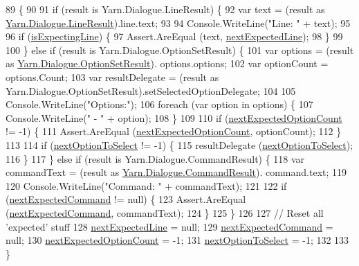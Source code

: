 \begin{DoxyCode}
89                                                                        \{
90 
91             \textcolor{keywordflow}{if} (result is Yarn.Dialogue.LineResult) \{
92                 var text = (result as \hyperlink{a00104}{Yarn.Dialogue.LineResult}).line.text;
93 
94                 Console.WriteLine(\textcolor{stringliteral}{"Line: "} + text);
95 
96                 \textcolor{keywordflow}{if} (\hyperlink{a00144_a47f35b8e8123ed9471883d02b8bc9f3e}{isExpectingLine}) \{
97                     Assert.AreEqual (text, \hyperlink{a00144_a3651ffb5425ab15bd1e42749347c1ee7}{nextExpectedLine});
98                 \}
99 
100             \} \textcolor{keywordflow}{else} \textcolor{keywordflow}{if} (result is Yarn.Dialogue.OptionSetResult) \{
101                 var options = (result as \hyperlink{a00117}{Yarn.Dialogue.OptionSetResult}).
      options.options;
102                 var optionCount = options.Count;
103                 var resultDelegate = (result as Yarn.Dialogue.OptionSetResult).setSelectedOptionDelegate;
104 
105                 Console.WriteLine(\textcolor{stringliteral}{"Options:"});
106                 \textcolor{keywordflow}{foreach} (var option \textcolor{keywordflow}{in} options) \{
107                     Console.WriteLine(\textcolor{stringliteral}{" - "} + option);
108                 \}
109 
110                 \textcolor{keywordflow}{if} (\hyperlink{a00144_aaabaf15249efe42f3d857129bdbc2864}{nextExpectedOptionCount} != -1) \{
111                     Assert.AreEqual (\hyperlink{a00144_aaabaf15249efe42f3d857129bdbc2864}{nextExpectedOptionCount}, optionCount);
112                 \}
113 
114                 \textcolor{keywordflow}{if} (\hyperlink{a00144_a343055fa693e9d5dfc1bdbfcd0f02676}{nextOptionToSelect} != -1) \{
115                     resultDelegate (\hyperlink{a00144_a343055fa693e9d5dfc1bdbfcd0f02676}{nextOptionToSelect});
116                 \}
117             \} \textcolor{keywordflow}{else} \textcolor{keywordflow}{if} (result is Yarn.Dialogue.CommandResult) \{
118                 var commandText = (result as \hyperlink{a00030}{Yarn.Dialogue.CommandResult}).
      command.text;
119 
120                 Console.WriteLine(\textcolor{stringliteral}{"Command: "} + commandText);
121 
122                 \textcolor{keywordflow}{if} (\hyperlink{a00144_a26fae5694fc06c3cdb12d3108dbc34de}{nextExpectedCommand} != null) \{
123                     Assert.AreEqual (\hyperlink{a00144_a26fae5694fc06c3cdb12d3108dbc34de}{nextExpectedCommand}, commandText);
124                 \}
125             \}
126 
127             \textcolor{comment}{// Reset all 'expected' stuff}
128             \hyperlink{a00144_a3651ffb5425ab15bd1e42749347c1ee7}{nextExpectedLine} = null;
129             \hyperlink{a00144_a26fae5694fc06c3cdb12d3108dbc34de}{nextExpectedCommand} = null;
130             \hyperlink{a00144_aaabaf15249efe42f3d857129bdbc2864}{nextExpectedOptionCount} = -1;
131             \hyperlink{a00144_a343055fa693e9d5dfc1bdbfcd0f02676}{nextOptionToSelect} = -1;
132 
133         \}
\end{DoxyCode}
